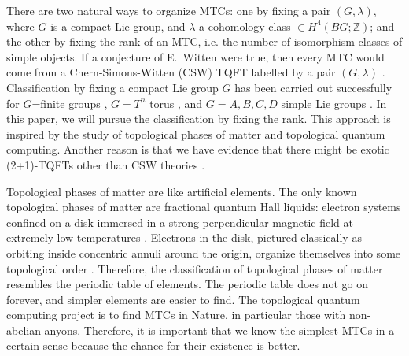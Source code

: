\documentclass[12pt,psamsfonts]{amsart}
\newcommand{\Z}{\mathbb Z}
\numberwithin{equation}{section}
\theoremstyle{definition}
\begin{document}
There are two natural ways to organize MTCs: one by fixing a pair
$(G,\lambda)$, where $G$ is a compact Lie group, and $\lambda$ a
cohomology class $\in H^4(BG;\Z)$; and the other by fixing the
rank of an MTC, i.e. the number of isomorphism classes of simple
objects. If a conjecture of E.~Witten were true, then every MTC
would come from a Chern-Simons-Witten (CSW) TQFT labelled by a
pair $(G,\lambda)$ \cite{Witten}\cite{MS1}\cite{HRW}.
Classification by fixing a compact Lie group $G$ has been carried
out successfully for $G$=finite groups \cite{DW}\cite{FQ}, $G=T^n$
torus \cite{Ma}\cite{BM}, and $G=A,B,C,D$ simple Lie groups
\cite{FK}\cite{KW}\cite{TuWe}. In this paper, we will pursue the
classification by fixing the rank. This approach is inspired by
the study of topological phases of matter and topological quantum
computing. Another reason is that we have evidence that there
might be exotic (2+1)-TQFTs other than CSW theories \cite{HRW}.

Topological phases of matter are like artificial elements.  The
only known topological phases of matter are fractional quantum
Hall liquids: electron systems confined on a disk immersed in a
strong perpendicular magnetic field at extremely low temperatures
\cite{Wilczek}\cite{DFN}.  Electrons in the disk, pictured classically as
orbiting inside concentric annuli around the origin, organize
themselves into some topological order \cite{Wen}\cite{WW1}\cite{WW2}.
Therefore, the classification of topological phases of matter
resembles the periodic table of elements.  The periodic table does
not go on forever, and simpler elements are easier to find. The
topological quantum computing project is to find MTCs in Nature,
in particular those with non-abelian anyons. Therefore, it is
important that we know the simplest MTCs in a certain sense
because the chance for their existence is better.
\end{document}
